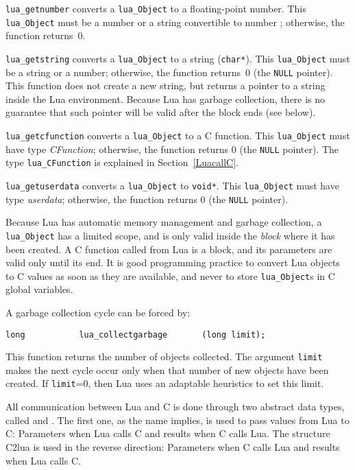 \verb|lua_getnumber| converts a \verb|lua_Object| to a floating-point number.
This \verb|lua_Object| must be a number or a string convertible to number
; otherwise, the function returns~0.

\verb|lua_getstring| converts a \verb|lua_Object| to a string (\verb|char*|).
This \verb|lua_Object| must be a string or a number;
otherwise, the function returns~0 (the \verb|NULL| pointer).
This function does not create a new string,
but returns a pointer to a string inside the Lua environment.
Because Lua has garbage collection,
there is no guarantee that such pointer will be valid after the block ends
(see below).

\verb|lua_getcfunction| converts a \verb|lua_Object| to a C function.
This \verb|lua_Object| must have type \emph{CFunction};
otherwise, the function returns 0 (the \verb|NULL| pointer).
The type \verb|lua_CFunction| is explained in Section~\ref{LuacallC}.

\verb|lua_getuserdata| converts a \verb|lua_Object| to \verb|void*|.
This \verb|lua_Object| must have type \emph{userdata};
otherwise, the function returns 0 (the \verb|NULL| pointer).

Because Lua has automatic memory management and garbage collection,
a \verb|lua_Object| has a limited scope,
and is only valid inside the \emph{block} where it has been created.
A C function called from Lua is a block,
and its parameters are valid only until its end.
It is good programming practice to convert Lua objects to C values
as soon as they are available,
and never to store \verb|lua_Object|s in C global variables.

A garbage collection cycle can be forced by:
\begin{verbatim}
long           lua_collectgarbage       (long limit);
\end{verbatim}
This function returns the number of objects collected.
The argument \verb|limit| makes the next cycle occur only
when that number of new objects have been created.
If \verb|limit|=0, then Lua uses an adaptable heuristics to set this limit.


All communication between Lua and C is done through two
abstract data types, called  and .
The first one, as the name implies, is used to pass values
from Lua to C:
Parameters when Lua calls C and results when C calls Lua.
The structure C2lua is used in the reverse direction:
Parameters when C calls Lua and results when Lua calls C.

